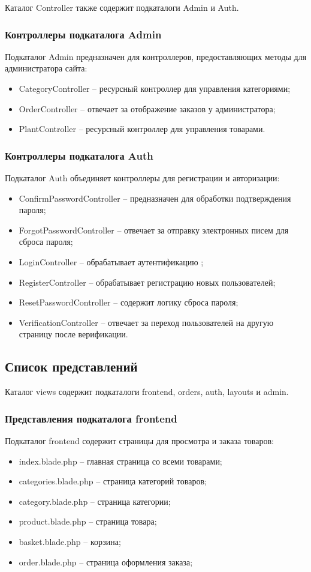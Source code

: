 Каталог Controller также содержит подкаталоги Admin и Auth.

\subsubsection{Контроллеры подкаталога Admin}
Подкаталог Admin предназначен для контроллеров, предоставляющих методы для администратора сайта:
\begin{itemize}
	\item CategoryController – ресурсный контроллер для управления категориями;
	\item OrderController – отвечает за отображение заказов у администратора;
	\item PlantController – ресурсный контроллер для управления товарами.
\end{itemize}

\subsubsection{Контроллеры подкаталога Auth}
Подкаталог Auth объединяет контроллеры для регистрации и авторизации: 
\begin{itemize}
	\item ConfirmPasswordController – предназначен для обработки подтверждения пароля;
	\item ForgotPasswordController – отвечает за отправку электронных писем для сброса пароля;
	\item LoginController – обрабатывает аутентификацию ;
	\item RegisterController – обрабатывает регистрацию новых пользователей;
	\item ResetPasswordController – содержит логику сброса пароля;
	\item VerificationController – отвечает за переход пользователей на другую страницу после верификации.
\end{itemize}

\subsection{Список представлений}

Каталог views содержит подкаталоги frontend, orders, auth, layouts и admin.

\subsubsection{Представления подкаталога frontend}
Подкаталог frontend содержит страницы для просмотра и заказа товаров:
\begin{itemize}
	\item index.blade.php – главная страница со всеми товарами;
	\item categories.blade.php – страница категорий товаров;
	\item category.blade.php – страница категории;
	\item product.blade.php – страница товара;
	\item basket.blade.php – корзина;
	\item order.blade.php – страница оформления заказа;
\end{itemize}

